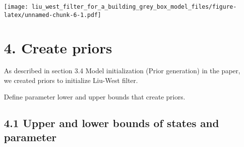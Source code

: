 \documentclass[
]{article}
\begin{document}
\texttt{[image: liu\_west\_filter\_for\_a\_building\_grey\_box\_model\_files/figure-latex/unnamed-chunk-6-1.pdf]}

\hypertarget{create-priors}{%
\section{4. Create priors}\label{create-priors}}

As described in section 3.4 Model initialization (Prior generation) in
the paper, we created priors to initialize Liu-West filter.

Define parameter lower and upper bounds that create priors.

\hypertarget{upper-and-lower-bounds-of-states-and-parameter}{%
\subsection{4.1 Upper and lower bounds of states and
parameter}\label{upper-and-lower-bounds-of-states-and-parameter}}
\end{document}
